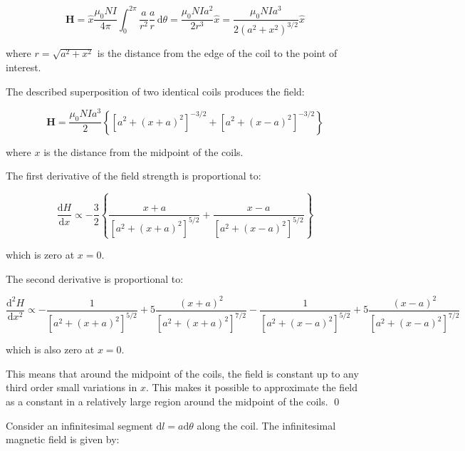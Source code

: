 \documentclass[12pt]{article}
\begin{document}
\begin{equation}
    \mathbf{H} = \hat{x} \frac{\mu_{0} N I}{4\pi} \int_{0}^{2\pi} \frac{a}{r^{2}} \frac{a}{r} \, \mathrm{d}\theta = \frac{\mu_{0} N I a^{2}}{2r^{3}} \hat{x} = \frac{\mu_{0} N I a^{3}}{2(a^{2} + x^{2})^{3/2}} \hat{x}
\end{equation}

where $r = \sqrt{a^{2} + x^{2}}$ is the distance from the edge of the coil to the point of interest.

The described superposition of two identical coils produces the field:

\begin{equation}
    \mathbf{H} = \frac{\mu_{0} N I a^{3}}{2} \left\{ \left[ a^{2} + (x + a)^2 \right]^{-3/2} + \left[ a^{2} + (x - a)^2 \right]^{-3/2} \right\}
\end{equation}

where $x$ is the distance from the midpoint of the coils.

The first derivative of the field strength is proportional to:

\begin{equation}
    \frac{\mathrm{d}H}{\mathrm{d}x} \propto -\frac{3}{2} \left\{ \frac{x + a}{\left[ a^{2} + (x + a)^2 \right]^{5/2}} + \frac{x - a}{\left[ a^{2} + (x - a)^2 \right]^{5/2}} \right\}
\end{equation}

which is zero at $x = 0$.

The second derivative is proportional to:

\begin{equation}
    \frac{\mathrm{d}^{2}H}{\mathrm{d}x^{2}} \propto -\frac{1}{\left[ a^{2} + (x + a)^2 \right]^{5/2}} + 5 \frac{(x + a)^{2}}{\left[ a^{2} + (x + a)^2 \right]^{7/2}} - \frac{1}{\left[ a^{2} + (x - a)^2 \right]^{5/2}} + 5 \frac{(x - a)^{2}}{\left[ a^{2} + (x - a)^2 \right]^{7/2}}
\end{equation}

which is also zero at $x = 0$.

This means that around the midpoint of the coils, the field is constant up to any third order small variations in $x$. This makes it possible to approximate the field as a constant in a relatively large region around the midpoint of the coils.
\qed


Consider an infinitesimal segment $\mathrm{d}l = a \mathrm{d}\theta$ along the coil. The infinitesimal magnetic field is given by:
\end{document}
